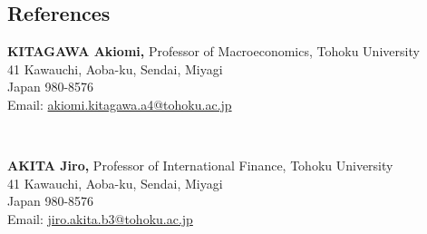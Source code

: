\documentclass[margin,line]{res}
\begin{document}
\begin{resume}
\newpage







\section{\sc References}
\vspace*{.05in}
\parbox{\textwidth}{
{\bf KITAGAWA Akiomi,} Professor of Macroeconomics, Tohoku University \\
41 Kawauchi, Aoba-ku, Sendai, Miyagi \\
Japan 980-8576 \\
Email: \href{mailto:akiomi.kitagawa.a4@tohoku.ac.jp}{akiomi.kitagawa.a4@tohoku.ac.jp}} \\

\par
\parbox{\textwidth}{
{\bf AKITA Jiro,} Professor of International Finance, Tohoku University\\
41 Kawauchi, Aoba-ku, Sendai, Miyagi \\
Japan 980-8576 \\
Email: \href{mailto:jiro.akita.b3@tohoku.ac.jp}{jiro.akita.b3@tohoku.ac.jp}}


\end{resume}
\end{document}
